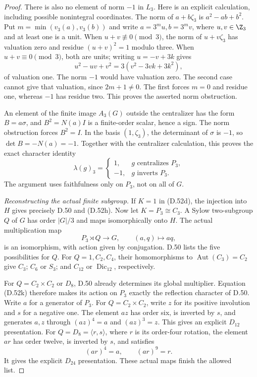 \begin{proof}
There is also no element of norm $-1$ in $L_3$.
Here is an explicit calculation, including
possible nonintegral coordinates.
The norm of $a+b\zeta_3$ is
$a^2-ab+b^2$. Put
$m=\min(v_3(a),v_3(b))$ and write
$a=3^m u,b=3^m v$, where $u,v\in\Z_3$
and at least one is a unit.
When $u+v\not\equiv0\pmod3$, the norm of
$u+v\zeta_3$ has valuation zero and residue
$(u+v)^2=1$ modulo three.
When $u+v\equiv0\pmod3$, both are units;
writing $u=-v+3k$ gives
\[
                  u^2-uv+v^2
                       =3(v^2-3vk+3k^2),               \tag{D.52j}
\]
of valuation one.
The norm $-1$ would have valuation zero.
The second case cannot give that valuation,
since $2m+1\ne0$.
The first forces $m=0$ and residue one,
whereas $-1$ has residue two.
This proves the asserted norm obstruction.

An element of the finite image $A_3(G)$
outside the centralizer has the form
$B=a\sigma$, and $B^2=N(a)I$ is a
finite-order scalar, hence a sign.
The norm obstruction forces $B^2=I$.
In the basis $(1,\zeta_3)$, the determinant
of $\sigma$ is $-1$, so
$\det B=-N(a)=-1$.
Together with the centralizer calculation,
this proves the exact character identity
\[
 \lambda(g)_3=
 \begin{cases}
  1,&g\text{ centralizes }P_3,\\
 -1,&g\text{ inverts }P_3.
 \end{cases}                                            \tag{D.52k}
\]
The argument uses faithfulness only on
$P_3$, not on all of $G$.

\emph{Reconstructing the actual finite subgroup.}
If $K=1$ in (D.52d), the injection into
$H$ gives precisely D.50 and (D.52h).
Now let $K=P_3\cong C_3$.
A Sylow two-subgroup $Q$ of $G$ has order
$|G|/3$ and maps isomorphically onto $H$.
The actual multiplication map
\[
                  P_3\rtimes Q\longrightarrow G,
                         \qquad (a,q)\longmapsto aq,    \tag{D.52l}
\]
is an isomorphism, with action given by
conjugation. D.50 lists the five possibilities
for $Q$.
For $Q=1,C_2,C_4$, their homomorphisms
to $\operatorname{Aut}(C_3)=C_2$ give
$C_3$; $C_6$ or $S_3$; and $C_{12}$ or
$\operatorname{Dic}_{12}$, respectively.

For $Q=C_2\times C_2$ or $D_8$, D.50
already determines its global multiplier.
Equation (D.52k) therefore makes its
action on $P_3$ exactly the reflection
character of D.50.
Write $a$ for a generator of $P_3$.
For $Q=C_2\times C_2$, write $z$ for its
positive involution and $s$ for a negative
one. The element $az$ has order six,
is inverted by $s$, and generates $a,z$
through $(az)^4=a$ and $(az)^3=z$.
This gives an explicit $D_{12}$ presentation.
For $Q=D_8=\langle r,s\rangle$, where
$r$ is its order-four rotation, the
element $ar$ has order twelve, is inverted
by $s$, and satisfies
\[
                       (ar)^4=a,\qquad (ar)^9=r.
                                                               \tag{D.52m}
\]
It gives the explicit $D_{24}$ presentation.
These actual maps finish the allowed list.


\end{proof}
